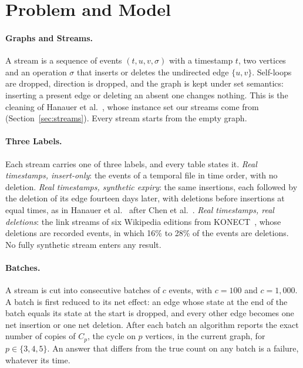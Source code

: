 
\section{Problem and Model}
\label{sec:model}

\paragraph{Graphs and Streams.}
A stream is a sequence of events $(t, u, v, \sigma)$ with a timestamp $t$, two vertices and an operation $\sigma$ that inserts or deletes the undirected edge $\{u, v\}$.
Self-loops are dropped, direction is dropped, and the graph is kept under set semantics: inserting a present edge or deleting an absent one changes nothing.
This is the cleaning of Hanauer et al.~\cite{hanauer-dyncount}, whose instance set our streams come from (Section~\ref{sec:streams}).
Every stream starts from the empty graph.

\paragraph{Three Labels.}
Each stream carries one of three labels, and every table states it.
\emph{Real timestamps, insert-only}: the events of a temporal file in time order, with no deletion.
\emph{Real timestamps, synthetic expiry}: the same insertions, each followed by the deletion of its edge fourteen days later, with deletions before insertions at equal times, as in Hanauer et al.~\cite{hanauer-dyncount} after Chen et al.~\cite{chen-expiry}.
\emph{Real timestamps, real deletions}: the link streams of six Wikipedia editions from KONECT~\cite{konect,preusse-wiki}, whose deletions are recorded events, in which 16\% to 28\% of the events are deletions.
No fully synthetic stream enters any result.

\paragraph{Batches.}
A stream is cut into consecutive batches of $c$ events, with $c = 100$ and $c = 1{,}000$.
A batch is first reduced to its net effect: an edge whose state at the end of the batch equals its state at the start is dropped, and every other edge becomes one net insertion or one net deletion.
After each batch an algorithm reports the exact number of copies of $C_p$, the cycle on $p$ vertices, in the current graph, for $p \in \{3, 4, 5\}$.
An answer that differs from the true count on any batch is a failure, whatever its time.

